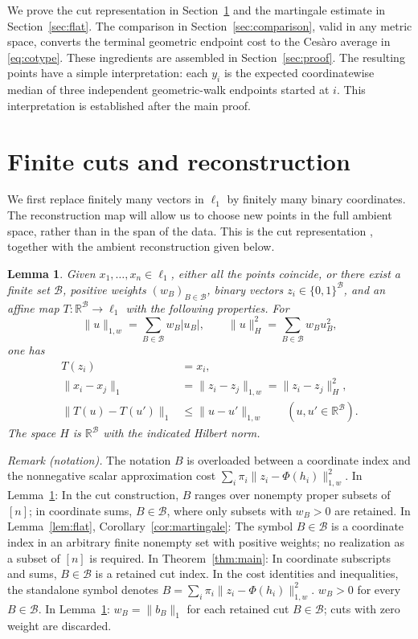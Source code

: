 \documentclass[11pt]{article}
\newtheorem{lemma}[theorem]{Lemma}
\theoremstyle{definition}
\theoremstyle{remark}
\numberwithin{equation}{section}
\newcommand{\R}{\mathbb R}
\begin{document}
We prove the cut representation in Section~\ref{sec:cuts} and the
martingale estimate in Section~\ref{sec:flat}. The comparison in
Section~\ref{sec:comparison}, valid in any metric space, converts
the terminal geometric endpoint cost to the Ces\`aro average in
\eqref{eq:cotype}. These ingredients are
assembled in Section~\ref{sec:proof}. The resulting points have a
simple interpretation: each $y_i$ is the expected coordinatewise
median of three independent geometric-walk endpoints started at
$i$. This interpretation is established after the main proof.

\section{Finite cuts and reconstruction}
\label{sec:cuts}

We first replace finitely many vectors in $\ell_1$ by finitely many
binary coordinates. The reconstruction map will allow us to
choose new points in the full ambient space, rather than in the
span of the data. This is the cut representation
\cite[Chapter~4]{DezaLaurent97}, together with the ambient reconstruction
given below.

\begin{lemma}\label{lem:cuts}
Given $x_1,\ldots,x_n\in\ell_1$, either all the points coincide,
or there exist a finite set $\mathcal B$, positive weights
$(w_B)_{B\in\mathcal B}$, binary vectors
$z_i\in\{0,1\}^{\mathcal B}$, and an affine map
$T:\R^{\mathcal B}\to\ell_1$ with the following properties.
For
\[
 \|u\|_{1,w}=\sum_{B\in\mathcal B}w_B|u_B|,
 \qquad
 \|u\|_H^2=\sum_{B\in\mathcal B}w_Bu_B^2,
\]
one has
\begin{align}
 T(z_i)&=x_i,\label{eq:reconstruct}\\
 \|x_i-x_j\|_1
 &=\|z_i-z_j\|_{1,w}=\|z_i-z_j\|_H^2,
 \label{eq:cut-distance}\\
 \|T(u)-T(u')\|_1&\leq\|u-u'\|_{1,w}
 \qquad(u,u'\in\R^{\mathcal B}).\label{eq:contraction}
\end{align}
The space $H$ is $\R^{\mathcal B}$ with the indicated Hilbert norm.
\end{lemma}

\noindent\textit{Remark (notation).} The notation $B$ is overloaded between a coordinate index and the nonnegative scalar approximation cost $\sum_i\pi_i\|z_i-\Phi(h_i)\|_{1,w}^2$. In Lemma~\ref{lem:cuts}: In the cut construction, $B$ ranges over nonempty proper subsets of $[n]$; in coordinate sums, $B\in\mathcal B$, where only subsets with $w_B>0$ are retained. In Lemma~\ref{lem:flat}, Corollary~\ref{cor:martingale}: The symbol $B\in\mathcal B$ is a coordinate index in an arbitrary finite nonempty set with positive weights; no realization as a subset of $[n]$ is required. In Theorem~\ref{thm:main}: In coordinate subscripts and sums, $B\in\mathcal B$ is a retained cut index. In the cost identities and inequalities, the standalone symbol denotes $B=\sum_i\pi_i\|z_i-\Phi(h_i)\|_{1,w}^2$. $w_B>0$ for every $B\in\mathcal B$. In Lemma~\ref{lem:cuts}: $w_B=\|b_B\|_1$ for each retained cut $B\in\mathcal B$; cuts with zero weight are discarded.
\end{document}
